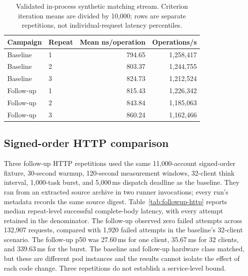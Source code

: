 \documentclass[envcountsame,runningheads,notitlepage]{llncs}
\begin{document}
\begin{table}[h]
\centering\small
\begin{tabular*}{\linewidth}{@{\extracolsep{\fill}}llrr}
\toprule
Campaign & Repeat & Mean ns/operation & Operations/s \\
\midrule
Baseline & 1 & 794.65 & 1,258,417 \\
Baseline & 2 & 803.37 & 1,244,755 \\
Baseline & 3 & 824.73 & 1,212,524 \\
Follow-up & 1 & 815.43 & 1,226,342 \\
Follow-up & 2 & 843.84 & 1,185,063 \\
Follow-up & 3 & 860.24 & 1,162,466 \\
\bottomrule
\end{tabular*}
\caption{Validated in-process synthetic matching stream. Criterion iteration means are divided by 10,000; rows are separate repetitions, not individual-request latency percentiles.}\label{tab:followup-engine}
\end{table}

\subsection{Signed-order HTTP comparison}
Three follow-up HTTP repetitions used the same 11,000-account signed-order fixture, 30-second warmup, 120-second measurement windows, 32-client think interval, 1,000-task burst, and 5,000\,ms dispatch deadline as the baseline. They ran from an extracted source archive in two runner invocations; every run's metadata records the same source digest. Table~\ref{tab:followup-http} reports median repeat-level successful complete-body latency, with every attempt retained in the denominator. The follow-up observed zero failed attempts across 132,907 requests, compared with 1,920 failed attempts in the baseline's 32-client scenario. The follow-up p50 was 27.60\,ms for one client, 35.67\,ms for 32 clients, and 339.63\,ms for the burst. The baseline and follow-up hardware class matched, but these are different pod instances and the results cannot isolate the effect of each code change. Three repetitions do not establish a service-level bound.\cite{benchdata,rebenchdata}
\end{document}
